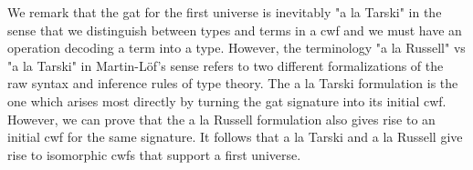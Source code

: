 \documentclass{lmcs}
\newcommand{\s}{\mathrm{s}}
\newcommand{\Ta}{\mathrm{T}}
\newcommand{\Level}{\mathrm{Level}}
\def\Ctx{\mathrm{Ctx}}
\begin{document}
We remark that the gat for the first universe is inevitably "a la Tarski" in the sense that we distinguish between types and terms in a cwf and we must have an operation decoding a term into a type. However, the terminology "a la Russell" vs "a la Tarski" in Martin-Löf's sense refers to two different formalizations of the raw syntax and inference rules of type theory. The a la Tarski formulation is the one which arises most directly by turning the gat signature into its initial cwf. However, we can prove that the a la Russell formulation also gives rise to an initial cwf for the same signature. It follows that a la Tarski and a la Russell give rise to isomorphic cwfs that support a first universe.

%
%
%
\end{document}
